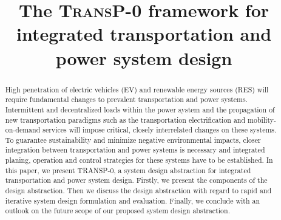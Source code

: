 \title{The \textsc{TransP-0} framework for integrated transportation and power system design}

\author{
	\and
}

\maketitle

\begin{abstract}
	High penetration of electric vehicles (EV) and renewable energy sources (RES) will require fundamental changes to prevalent transportation and power systems. Intermittent and decentralized loads within the power system and the propagation of new transportation paradigms such as the transportation electrification and mobility-on-demand services will impose critical, closely interrelated changes on these systems.
	To guarantee sustainability and minimize negative environmental impacts, closer integration between transportation and power systems is necessary and integrated planing, operation and control strategies for these systems have to be established. In this paper, we present TRANSP-0, a system design abstraction for integrated transportation and power system design. Firstly, we present the components of the design abstraction.  Then we discuss the design abstraction with regard to rapid and iterative system design formulation and evaluation. Finally, we conclude with an outlook on the future scope of our proposed system design abstraction.
\end{abstract}
